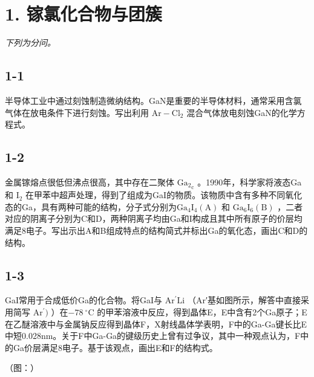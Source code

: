 \section*{1. 镓氯化合物与团簇}
\textit{下列为分问。}

\subsection*{1-1}
半导体⼯业中通过刻蚀制造微纳结构。GaN是重要的半导体材料，通常采⽤含氯⽓体在放电条件下进⾏刻蚀。写出利⽤ $\mathrm { A r } { - } \mathrm { C l } _ { 2 }$ 混合⽓体放电刻蚀GaN的化学⽅程式。

\subsection*{1-2}
⾦属镓熔点很低但沸点很⾼，其中存在⼆聚体 $\mathrm { G a _ { 2 } } _ { \mathrm { { c } } }$ 。1990年，科学家将液态Ga和 $\mathrm { I } _ { 2 }$ 在甲苯中超声处理，得到了组成为GaI的物质。该物质中含有多种不同氧化态的Ga，具有两种可能的结构，分⼦式分别为$\mathrm { G a } _ { 4 } \mathrm { I } _ { 4 } \left( \mathrm { A } \right)$ 和 $\mathrm { G a } _ { 6 } \mathrm { I } _ { 6 } \left( \mathrm { B } \right)$ ，⼆者对应的阴离⼦分别为C和D，两种阴离⼦均由Ga和I构成且其中所有原⼦的价层均满⾜8电⼦。写出⽰出A和B组成特点的结构简式并标出Ga的氧化态，画出C和D的结构。

\subsection*{1-3}
GaI常⽤于合成低价Ga的化合物。将GaI与 $\mathrm { A r ^ { \prime } L i }$ （Ar′基如图所⽰，解答中直接采⽤简写 $\mathrm { A r ^ { \prime } } )$ ）在−$7 8 ~ ^ { \circ } \mathrm { C }$ 的甲苯溶液中反应，得到晶体E，E中含有2个Ga原⼦；E在⼄醚溶液中与⾦属钠反应得到晶体F，X射线晶体学表明，F中的Ga-Ga键⻓⽐E中短0.028nm。关于F中Ga-Ga的键级历史上曾有过争议，其中⼀种观点认为，F中的Ga价层满⾜8电⼦。基于该观点，画出E和F的结构式。

（图：）
